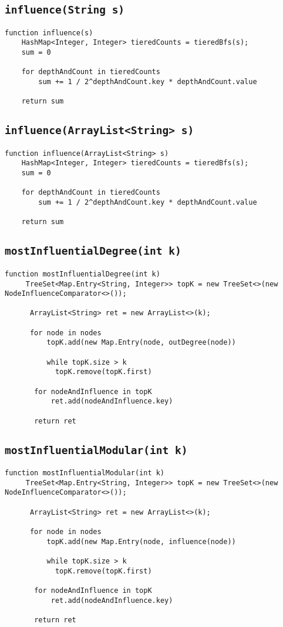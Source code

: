 \documentclass[10pt,letterpaper]{article}
\begin{document}
\subsection{\texttt{influence(String s)}}
\begin{verbatim}
function influence(s)
    HashMap<Integer, Integer> tieredCounts = tieredBfs(s);
    sum = 0

	for depthAndCount in tieredCounts
		sum += 1 / 2^depthAndCount.key * depthAndCount.value

	return sum
\end{verbatim}
\subsection{\texttt{influence(ArrayList<String> s)}}
\begin{verbatim}
function influence(ArrayList<String> s)
    HashMap<Integer, Integer> tieredCounts = tieredBfs(s);
    sum = 0

	for depthAndCount in tieredCounts
		sum += 1 / 2^depthAndCount.key * depthAndCount.value

	return sum
\end{verbatim}
\subsection{\texttt{mostInfluentialDegree(int k)}}
\begin{verbatim}
function mostInfluentialDegree(int k)
     TreeSet<Map.Entry<String, Integer>> topK = new TreeSet<>(new NodeInfluenceComparator<>());
     
      ArrayList<String> ret = new ArrayList<>(k);
      
      for node in nodes
          topK.add(new Map.Entry(node, outDegree(node))
          
          while topK.size > k
          	topK.remove(topK.first)
       
       for nodeAndInfluence in topK
           ret.add(nodeAndInfluence.key)
       
       return ret
\end{verbatim}
\subsection{\texttt{mostInfluentialModular(int k)}}
\begin{verbatim}
function mostInfluentialModular(int k)
     TreeSet<Map.Entry<String, Integer>> topK = new TreeSet<>(new NodeInfluenceComparator<>());
     
      ArrayList<String> ret = new ArrayList<>(k);
      
      for node in nodes
          topK.add(new Map.Entry(node, influence(node))
          
          while topK.size > k
          	topK.remove(topK.first)
       
       for nodeAndInfluence in topK
           ret.add(nodeAndInfluence.key)
       
       return ret
\end{verbatim}
\end{document}
